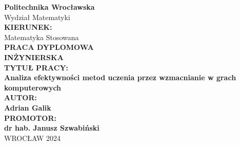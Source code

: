 \documentclass[a4paper, 12pt]{article}
\begin{document}
    \thispagestyle{empty}

    \begin{center}
        \textbf{\LARGE Politechnika Wrocławska} \\[1em]
        \Large Wydział Matematyki \\[2em]

        \textbf{KIERUNEK:} \\
        \Large Matematyka Stosowana \\[2em]

        \textbf{\LARGE PRACA DYPLOMOWA \\[0.5em] INŻYNIERSKA} \\[6em]

        \textbf{\large TYTUŁ PRACY:} \\[1em]
        \textbf{\Large Analiza efektywności metod uczenia przez wzmacnianie w grach komputerowych} \\[2em]

        \textbf{\large AUTOR:} \\[1em]
        \textbf{\Large Adrian Galik} \\[2em]

        \textbf{\large PROMOTOR:} \\[1em]
        \textbf{\Large dr hab. Janusz Szwabiński } \\[10em]

        WROCŁAW 2024
    \end{center}

    \newpage
\end{document}
